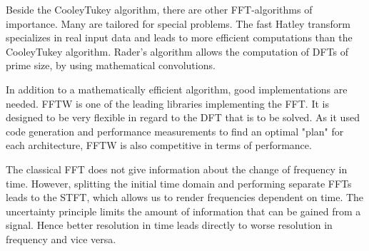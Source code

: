 \documentclass{usiinftr}
\begin{document}
Beside the Cooley\textendash Tukey algorithm, there are other FFT-algorithms of importance.
Many are tailored for special problems.
The fast Hatley transform specializes in real input data and leads to more efficient computations than the Cooley\textendash Tukey algorithm.
Rader's algorithm allows the computation of DFTs of prime size, by using mathematical convolutions.

In addition to a mathematically efficient algorithm, good implementations are needed.
FFTW is one of the leading libraries implementing the FFT.
It is designed to be very flexible in regard to the DFT that is to be solved.
As it used code generation and performance measurements to find an optimal "plan" for each architecture, FFTW is also competitive in terms of performance.

The classical FFT does not give information about the change of frequency in time.
However, splitting the initial time domain and performing separate FFTs leads to the STFT, which allows us to render frequencies dependent on time.
The uncertainty principle limits the amount of information that can be gained from a signal.
Hence better resolution in time leads directly to worse resolution in frequency and vice versa.




\end{document}
